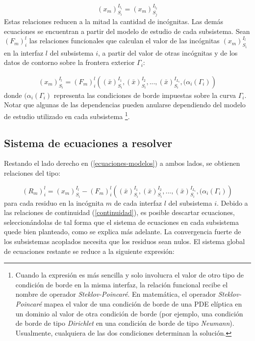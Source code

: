 \begin{equation}
{(x_m)_{S_i}^{I_{l_1}}}={(x_m)_{S_j}^{I_{l_2}}}
\label{continuidad}
\end{equation}
Estas relaciones reducen a la mitad la cantidad de incógnitas.
Las demás ecuaciones se encuentran a partir del modelo de estudio de cada subsistema. 
Sean $(F_m)_{i}^{l}$ las relaciones funcionales que calculan el valor de las incógnitas ${(x_m)_{S_i}^{I_l}}$ en la interfaz $l$ del subsistema $i$,
a partir del valor de otras incógnitas y de los datos de contorno sobre la frontera exterior $\Gamma_i$:

\begin{equation}
\begin{split}
  (x_m)_{S_i}^{I_l} = (F_m)_{i}^{l} \left ( (\bar{x})_{S_i}^{I_1}, (\bar{x})_{S_i}^{I_2}, ..., 
  (\bar{x})_{S_i}^{I_{L_i}}, (\alpha_i({\Gamma_i}) \right )
\end{split}
\label{ecuaciones-modelos}
\end{equation}
donde $(\alpha_i({\Gamma_i})$ representa las condiciones de borde impuestas sobre la curva $\Gamma_i$.
Notar que algunas de las dependencias pueden anularse dependiendo del modelo de estudio utilizado en cada subsistema
\footnote{
Cuando la expresión es más sencilla y solo involucra el valor de otro tipo de condición de borde en la misma interfaz,
la relación funcional recibe el nombre de operador \textit{Steklov-Poincaré}.
En matemática, el operador \textit{Steklov-Poincaré} mapea el valor de una condición de borde de una PDE elíptica en un dominio al valor
de otra condición de borde (por ejemplo, una condición de borde de tipo \textit{Dirichlet} en una condición de borde de tipo \textit{Neumann}).
Usualmente, cualquiera de las dos condiciones determinan la solución.
}.

\subsection{Sistema de ecuaciones a resolver}
\label{1:ecuaciones}
Restando el lado derecho en (\ref{ecuaciones-modelos}) a ambos lados, se obtienen relaciones del tipo:

\begin{equation}
(R_m)_{i}^{l} =   (x_m)_{S_i}^{I_l} - (F_m)_{i}^{l} \left ( (\bar{x})_{S_i}^{I_1}, (\bar{x})_{S_i}^{I_2}, ..., 
  (\bar{x})_{S_i}^{I_{L_i}}, (\alpha_i({\Gamma_i}) \right ) 
\label{ecuaciones-residuos}
\end{equation}
para cada residuo en la incógnita $m$ de cada interfaz $l$ del subsistema $i$.
Debido a las relaciones de continuidad (\ref{continuidad}), es posible descartar ecuaciones,
seleccionándolas de tal forma que el sistema de ecuaciones en cada subsistema quede bien planteado,
como se explica más adelante.
La convergencia fuerte de los subsistemas acoplados necesita que los residuos sean nulos.
El sistema global de ecuaciones restante se reduce a la siguiente expresión:

